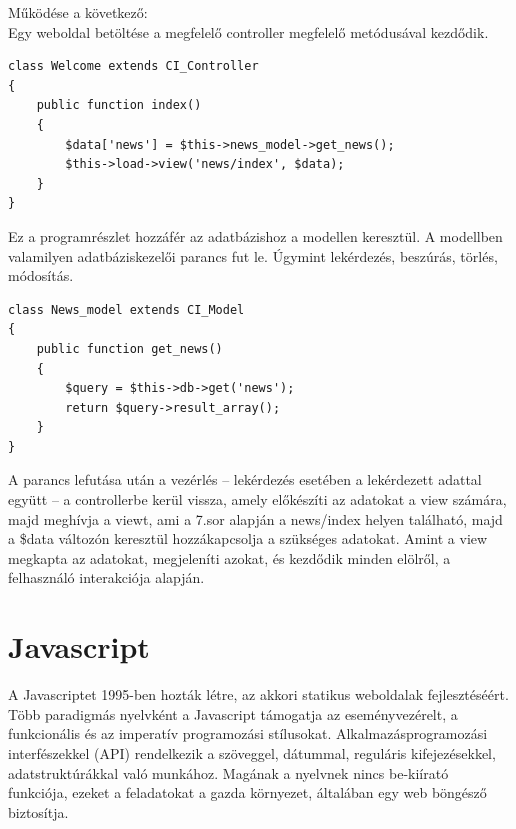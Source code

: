 \documentclass[
]{thesis-ekf}
\begin{document}
Működése a következő:\\
Egy weboldal betöltése a megfelelő controller megfelelő metódusával kezdődik. 
\begin{lstlisting}
class Welcome extends CI_Controller
{
	public function index()
	{
		$data['news'] = $this->news_model->get_news();
		$this->load->view('news/index', $data);
	}
}
\end{lstlisting}
\newpage
Ez a programrészlet hozzáfér az adatbázishoz a modellen keresztül. A modellben valamilyen adatbáziskezelői parancs fut le. Úgymint lekérdezés, beszúrás, törlés, módosítás. 
\begin{lstlisting}
class News_model extends CI_Model
{
	public function get_news()
	{
		$query = $this->db->get('news');
		return $query->result_array();
	}
}
\end{lstlisting}
A parancs lefutása után a vezérlés -- lekérdezés esetében a lekérdezett adattal együtt -- a controllerbe kerül vissza, amely előkészíti az adatokat a view számára, majd meghívja a viewt, ami a 7.sor alapján a news/index helyen található, majd a \$data változón keresztül hozzákapcsolja a szükséges adatokat. Amint a view megkapta az adatokat, megjeleníti azokat, és kezdődik minden elölről, a felhasználó interakciója alapján.
\section{Javascript}
A Javascriptet 1995-ben hozták létre, az akkori statikus weboldalak fejlesztéséért.
Több paradigmás nyelvként a Javascript támogatja az eseményvezérelt, a funkcionális és az imperatív programozási stílusokat. Alkalmazásprogramozási interfészekkel (API) rendelkezik a szöveggel, dátummal, reguláris kifejezésekkel, adatstruktúrákkal való munkához. Magának a nyelvnek nincs be-kiírató funkciója, ezeket a feladatokat a gazda környezet, általában egy web böngésző biztosítja.
\end{document}
